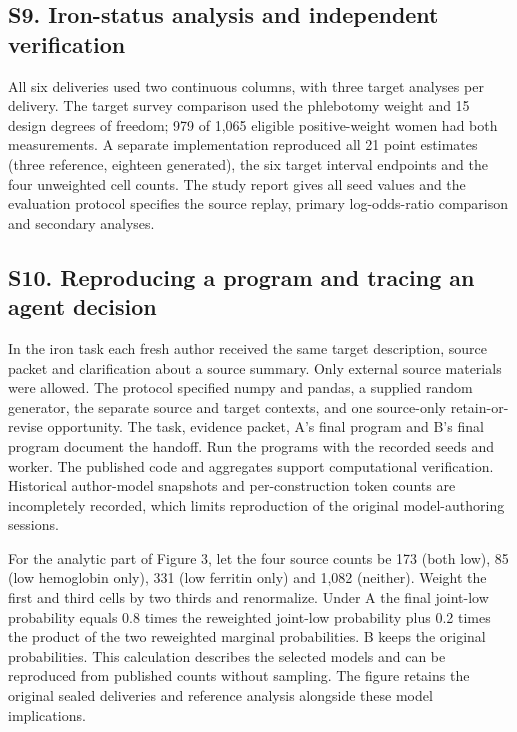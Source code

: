 \documentclass[sigconf,review]{acmart}
\begin{document}
\subsection*{S9. Iron-status analysis and independent verification}

All six deliveries used two continuous columns, with three target analyses per delivery. The target survey comparison used the phlebotomy weight and 15 design degrees of freedom; 979 of 1,065 eligible positive-weight women had both measurements. A separate implementation reproduced all 21 point estimates (three reference, eighteen generated), the six target interval endpoints and the four unweighted cell counts. The study report gives all seed values and the evaluation protocol specifies the source replay, primary log-odds-ratio comparison and secondary analyses.


\subsection*{S10. Reproducing a program and tracing an agent decision}

In the iron task each fresh author received the same target description, source packet and clarification about a source summary. Only external source materials were allowed. The protocol specified numpy and pandas, a supplied random generator, the separate source and target contexts, and one source-only retain-or-revise opportunity. The task, evidence packet, A's final program and B's final program document the handoff. Run the programs with the recorded seeds and worker. The published code and aggregates support computational verification. Historical author-model snapshots and per-construction token counts are incompletely recorded, which limits reproduction of the original model-authoring sessions.


For the analytic part of Figure 3, let the four source counts be 173 (both low), 85 (low hemoglobin only), 331 (low ferritin only) and 1,082 (neither). Weight the first and third cells by two thirds and renormalize. Under A the final joint-low probability equals 0.8 times the reweighted joint-low probability plus 0.2 times the product of the two reweighted marginal probabilities. B keeps the original probabilities. This calculation describes the selected models and can be reproduced from published counts without sampling. The figure retains the original sealed deliveries and reference analysis alongside these model implications.
\end{document}
